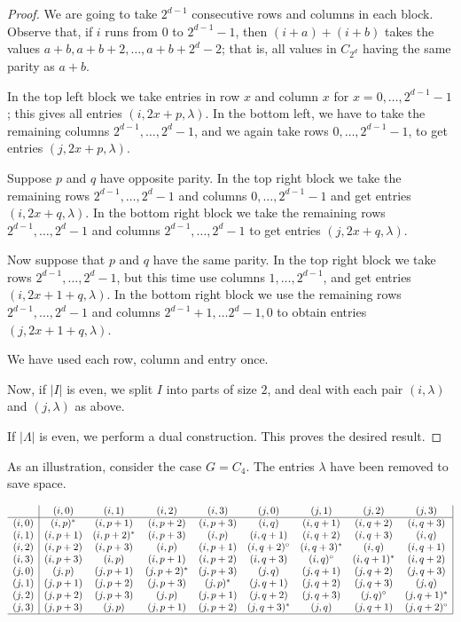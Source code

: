 \documentclass[11pt]{article}
\theoremstyle{plain}
\theoremstyle{remark}
\theoremstyle{definition}
\theoremstyle{plain}
\begin{document}
\begin{proof}
We are going to take $2^{d-1}$ consecutive rows and columns in each block. Observe that, if $i$ runs from $0$ to $2^{d-1}-1$, then $(i+a)+(i+b)$ takes the values $a+b,a+b+2,\ldots,a+b+2^d-2$; that is, all values in $C_{2^d}$ having the same parity as $a+b$.

In the top left block we take entries in row $x$ and column $x$ for
$x=0,\ldots,2^{d-1}-1$; this gives all entries $(i,2x+p,\lambda)$. In
the bottom left, we have to take the remaining columns $2^{d-1},\ldots,2^d-1$, and we again take rows $0,\ldots,2^{d-1}-1$, to get entries $(j,2x+p,\lambda)$.

Suppose $p$ and $q$ have opposite parity. In the top right block we take
the remaining rows $2^{d-1},\ldots,2^d-1$ and columns $0,\ldots,2^{d-1}-1$
and get entries $(i,2x+q,\lambda)$. In the bottom right block we take
the remaining rows $2^{d-1},\ldots,2^d-1$ and columns $2^{d-1},\ldots,2^d-1$ to get entries $(j,2x+q,\lambda)$.

Now suppose that $p$ and $q$ have the same parity. In the top right block we take rows $2^{d-1},\ldots,2^d-1$, but this time use columns
$1,\ldots,2^{d-1}$, and get entries $(i,2x+1+q,\lambda)$. In the bottom right block we use the remaining rows $2^{d-1},\ldots,2^d-1$ and columns
$2^{d-1}+1,\ldots2^d-1,0$ to obtain entries $(j,2x+1+q,\lambda)$.

We have used each row, column and entry once.

Now, if $|I|$ is even, we split $I$ into parts of size $2$, and deal
with each pair $(i,\lambda)$ and $(j,\lambda)$ as above.

If $|\Lambda|$ is even, we perform a dual construction. This proves the desired result.
\end{proof}

As an illustration, consider the case $G=C_4$. The entries $\lambda$ have been removed to save space.

{\tiny
\[
\begin{array}{c|cccccccc|}
&(i,0)&(i,1)&(i,2)&(i,3)&(j,0)&(j,1)&(j,2)&(j,3)\\\hline
(i,0)&(i,p)^*&(i,p+1)&(i,p+2)&(i,p+3)&(i,q)&(i,q+1)&(i,q+2)&(i,q+3)\\
(i,1)&(i,p+1)&(i,p+2)^*&(i,p+3)&(i,p)&(i,q+1)&(i,q+2)&(i,q+3)&(i,q)\\
(i,2)&(i,p+2)&(i,p+3)&(i,p)&(i,p+1)&(i,q+2)^\circ&(i,q+3)^*&(i,q)&(i,q+1)\\
(i,3)&(i,p+3)&(i,p)&(i,p+1)&(i,p+2)&(i,q+3)&(i,q)^\circ&(i,q+1)^*&(i,q+2)\\
(j,0)&(j,p)&(j,p+1)&(j,p+2)^*&(j,p+3)&(j,q)&(j,q+1)&(j,q+2)&(j,q+3)\\
(j,1)&(j,p+1)&(j,p+2)&(j,p+3)&(j,p)^*&(j,q+1)&(j,q+2)&(j,q+3)&(j,q)\\
(j,2)&(j,p+2)&(j,p+3)&(j,p)&(j,p+1)&(j,q+2)&(j,q+3)&(j,q)^\circ&(j,q+1)^*\\
(j,3)&(j,p+3)&(j,p)&(j,p+1)&(j,p+2)&(j,q+3)^*&(j,q)&(j,q+1)&(j,q+2)^\circ\\
\hline
\end{array}
\]
}
\end{document}
